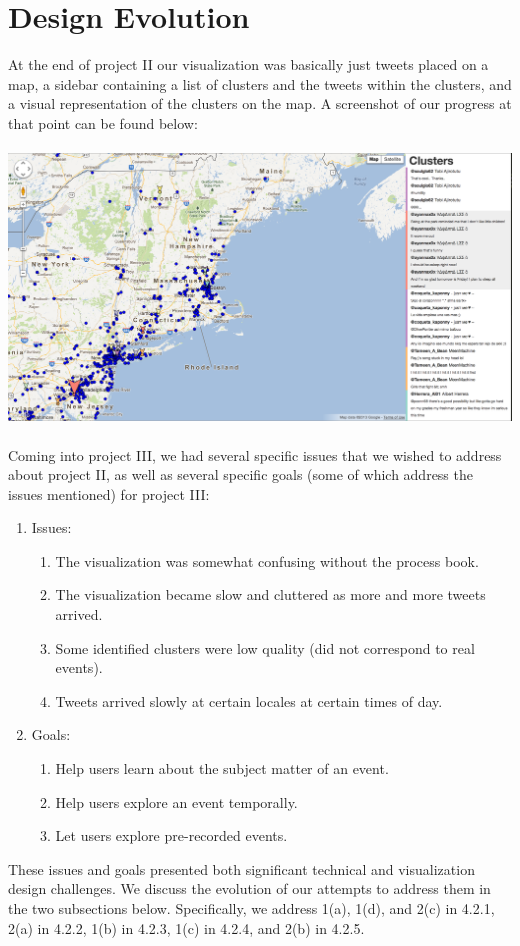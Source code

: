 \documentclass[pdftex,12pt,a4paper]{article}
\begin{document}
\section{Design Evolution}
At the end of project II our visualization was basically just tweets placed on a map, a sidebar containing a list of clusters and the tweets within the clusters, and a visual representation of the clusters on the map. A screenshot of our progress at that point can be found below: \\ \\
\includegraphics[width=5.5in]{project2.png} \\ \\
Coming into project III, we had several specific issues that we wished to address about project II, as well as several specific goals (some of which address the issues mentioned) for project III:
\begin{enumerate}
\item Issues:
\begin{enumerate}
\item The visualization was somewhat confusing without the process book.
\item The visualization became slow and cluttered as more and more tweets arrived.
\item Some identified clusters were low quality (did not correspond to real events).
\item Tweets arrived slowly at certain locales at certain times of day.
\end{enumerate}
\item Goals:
\begin{enumerate}
\item Help users learn about the subject matter of an event.
\item Help users explore an event temporally.
\item Let users explore pre-recorded events. 
\end{enumerate}
\end{enumerate}
These issues and goals presented both significant technical and visualization design challenges. We discuss the evolution of our attempts to address them in the two subsections below. Specifically, we  address 1(a), 1(d), and 2(c) in 4.2.1, 2(a) in 4.2.2, 1(b) in 4.2.3, 1(c) in 4.2.4, and 2(b) in 4.2.5.
\end{document}
